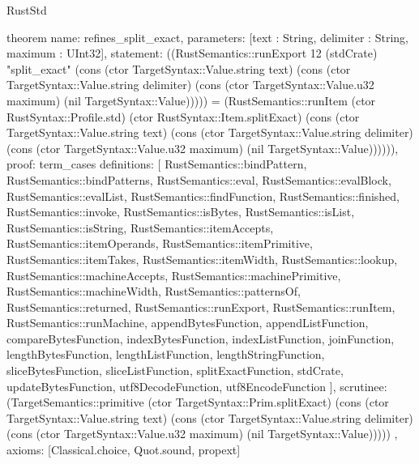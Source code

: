 \begin{lexlean}{RustStd}
\begin{semanticmodule}
theorem{
  name: refines_split_exact,
  parameters: [text : String, delimiter : String, maximum : UInt32],
  statement: ((RustSemantics::runExport 12 (stdCrate) "split_exact" (cons (ctor TargetSyntax::Value.string text) (cons (ctor TargetSyntax::Value.string delimiter) (cons (ctor TargetSyntax::Value.u32 maximum) (nil TargetSyntax::Value))))) = (RustSemantics::runItem (ctor RustSyntax::Profile.std) (ctor RustSyntax::Item.splitExact) (cons (ctor TargetSyntax::Value.string text) (cons (ctor TargetSyntax::Value.string delimiter) (cons (ctor TargetSyntax::Value.u32 maximum) (nil TargetSyntax::Value)))))),
  proof: term_cases{
    definitions: [
      RustSemantics::bindPattern,
      RustSemantics::bindPatterns,
      RustSemantics::eval,
      RustSemantics::evalBlock,
      RustSemantics::evalList,
      RustSemantics::findFunction,
      RustSemantics::finished,
      RustSemantics::invoke,
      RustSemantics::isBytes,
      RustSemantics::isList,
      RustSemantics::isString,
      RustSemantics::itemAccepts,
      RustSemantics::itemOperands,
      RustSemantics::itemPrimitive,
      RustSemantics::itemTakes,
      RustSemantics::itemWidth,
      RustSemantics::lookup,
      RustSemantics::machineAccepts,
      RustSemantics::machinePrimitive,
      RustSemantics::machineWidth,
      RustSemantics::patternsOf,
      RustSemantics::returned,
      RustSemantics::runExport,
      RustSemantics::runItem,
      RustSemantics::runMachine,
      appendBytesFunction,
      appendListFunction,
      compareBytesFunction,
      indexBytesFunction,
      indexListFunction,
      joinFunction,
      lengthBytesFunction,
      lengthListFunction,
      lengthStringFunction,
      sliceBytesFunction,
      sliceListFunction,
      splitExactFunction,
      stdCrate,
      updateBytesFunction,
      utf8DecodeFunction,
      utf8EncodeFunction
    ],
    scrutinee: (TargetSemantics::primitive (ctor TargetSyntax::Prim.splitExact) (cons (ctor TargetSyntax::Value.string text) (cons (ctor TargetSyntax::Value.string delimiter) (cons (ctor TargetSyntax::Value.u32 maximum) (nil TargetSyntax::Value)))))
  },
  axioms: [Classical.choice, Quot.sound, propext]
}


\end{semanticmodule}
\end{lexlean}
